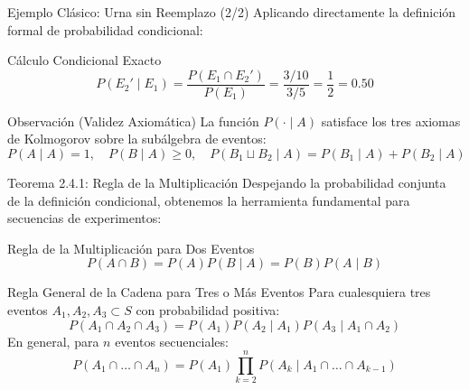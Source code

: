 \documentclass[10pt,aspectratio=169]{beamer}
\begin{document}
\begin{frame}{Ejemplo Clásico: Urna sin Reemplazo (2/2)}
  \small
  Aplicando directamente la definición formal de probabilidad condicional: \pause

  \vspace{0.2em}
  \begin{alertblock}{Cálculo Condicional Exacto}
    $$P(E_2' \mid E_1) = \dfrac{P(E_1 \cap E_2')}{P(E_1)} = \dfrac{3/10}{3/5} = \dfrac{1}{2} = 0.50$$
  \end{alertblock}

  \vspace{0.2em}
  \pause
  \begin{block}{Observación (Validez Axiomática)}
    La función $P(\cdot \mid A)$ satisface los tres axiomas de Kolmogorov sobre la subálgebra de eventos:
    $$P(A \mid A) = 1, \quad P(B \mid A) \geq 0, \quad P(B_1 \sqcup B_2 \mid A) = P(B_1 \mid A) + P(B_2 \mid A)$$
  \end{block}
\end{frame}

\begin{frame}{Teorema 2.4.1: Regla de la Multiplicación}
  \footnotesize
  Despejando la probabilidad conjunta de la definición condicional, obtenemos la herramienta fundamental para secuencias de experimentos: \pause

  \vspace{0.1em}
  \begin{block}{Regla de la Multiplicación para Dos Eventos}
    $$P(A \cap B) = P(A) P(B \mid A) = P(B) P(A \mid B)$$
  \end{block}

  \vspace{0.1em}
  \pause
  \begin{block}{Regla General de la Cadena para Tres o Más Eventos}
    Para cualesquiera tres eventos $A_1, A_2, A_3 \subset S$ con probabilidad positiva:
    $$P(A_1 \cap A_2 \cap A_3) = P(A_1) P(A_2 \mid A_1) P(A_3 \mid A_1 \cap A_2)$$
    En general, para $n$ eventos secuenciales:
    $$P(A_1 \cap \dots \cap A_n) = P(A_1) \prod_{k=2}^{n} P(A_k \mid A_1 \cap \dots \cap A_{k-1})$$
  \end{block}
\end{frame}
\end{document}
